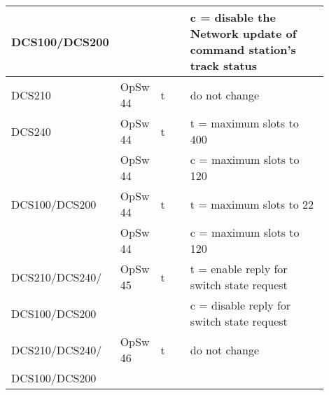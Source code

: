 \begin{tabular}{|p{0.2\linewidth}|p{0.125\linewidth}|p{0.1\linewidth}|p{0.475\linewidth}|}
DCS100/DCS200&&& c = disable the Network update of command station's track status\\
\hline
DCS210 & OpSw 44 & t & do not change\\
\hline
 DCS240  & OpSw 44 & t & t = maximum slots to 400\\
    & OpSw 44 & & c = maximum slots to 120\\
\hline
 DCS100/DCS200  & OpSw 44 & t & t = maximum slots to 22\\
    & OpSw 44 & & c = maximum slots to 120\\
\hline
DCS210/DCS240/ & OpSw 45 & t & t = enable reply for switch state request\\
DCS100/DCS200&&& c = disable reply for switch state request\\
\hline
DCS210/DCS240/ & OpSw 46 & t & do not change\\ 
DCS100/DCS200 &&&\\
\hline
\end{tabular}
\newpage
